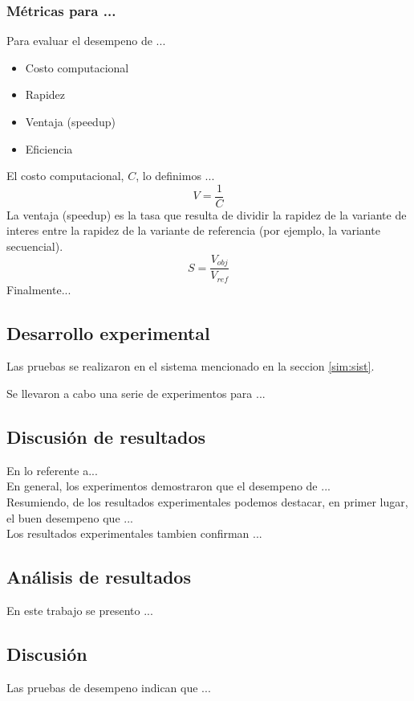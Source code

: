 \subsubsection{M\'{e}tricas para ...}
Para evaluar el desempeno de ...
\begin{itemize}
\item Costo computacional
\item Rapidez
\item Ventaja (speedup)
\item Eficiencia 
\end{itemize}
El costo computacional, $C$, lo definimos ...
\begin{equation}
V =\frac{1}{C}
\label{eq:06}
\end{equation}
La ventaja (speedup) es la tasa que resulta de dividir la rapidez de la variante de interes  entre la rapidez de la variante de referencia (por ejemplo, la variante secuencial).
\begin{equation}
S =\frac{V_{obj}}{V_{ref}}
\label{eq:06}
\end{equation}
Finalmente...  


\subsection{Desarrollo experimental}
Las pruebas se realizaron en el sistema mencionado en la seccion \ref{sim:sist}.

Se llevaron a cabo una serie de experimentos para ...


\subsection{Discusi\'{o}n de resultados}


En lo referente a...\\



En general, los experimentos demostraron que el desempeno de ...\\


Resumiendo, de los resultados experimentales podemos destacar, en primer lugar, el buen desempeno que ...\\


Los resultados experimentales tambien confirman ...


\subsection{An\'{a}lisis de resultados}
En este trabajo se presento ...

 
\subsection{Discusi\'{o}n}
Las pruebas de desempeno indican que ...\\

